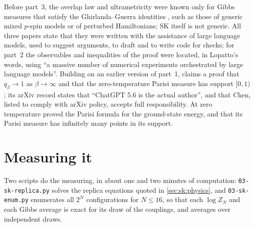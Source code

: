 \begin{refsection}
Before part~3, the overlap law and ultrametricity were known only for Gibbs measures that satisfy the Ghirlanda--Guerra identities \parencite{Panchenko2013a,Panchenko2013b}, such as those of generic mixed $p$-spin models or of perturbed Hamiltonians; SK itself is not generic. All three papers state that they were written with the assistance of large language models, used to suggest arguments, to draft and to write code for checks; for part~2 the observables and inequalities of the proof were located, in Lopatto's words, using \enquote{a massive number of numerical experiments orchestrated by large language models}. Building on an earlier version of part~1, \textcite{ChenHB2026} claims a proof that $q_\beta\to1$ as $\beta\to\infty$ and that the zero-temperature Parisi measure has support $[0,1)$; its arXiv record states that \enquote{ChatGPT 5.6 is the actual author}, and that Chen, listed to comply with arXiv policy, accepts full responsibility. At zero temperature \textcite{AuffingerChen2017} proved the Parisi formula for the ground-state energy, and \textcite{AuffingerChenZeng2020} that its Parisi measure has infinitely many points in its support.

\section{Measuring it}\label{sec:sk:measuring}

Two scripts do the measuring, in about one and two minutes of computation: \texttt{03-sk-replica.py} solves the replica equations quoted in \cref{sec:sk:physics}, and \texttt{03-sk-enum.py} enumerates all $2^N$ configurations for $N\le16$, so that each $\log Z_N$ and each Gibbs average is exact for its draw of the couplings, and averages over independent draws.


\end{refsection}
